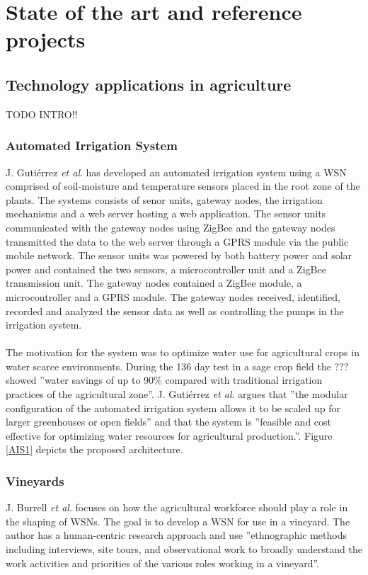\documentclass[]{uiophd}
\begin{document}
\chapter{State of the art and reference projects}

\section{Technology applications in agriculture}
TODO INTRO!!

\subsection{Automated Irrigation System}
J. Gutiérrez \textit{et al}. \parencite{6582678} has developed an automated irrigation system using a WSN comprised of soil-moisture and temperature sensors placed in the root zone of the plants. The systems consists of senor units, gateway nodes, the irrigation mechanisms and a web server hosting a web application. The sensor units communicated with the gateway nodes using ZigBee and the gateway nodes transmitted the data to the web server through a GPRS module via the public mobile network. The sensor units was powered by both battery power and solar power and contained the two sensors, a microcontroller unit and a ZigBee transmission unit. The gateway nodes contained a ZigBee module, a microcontroller and a GPRS module. The gateway nodes received, identified, recorded and analyzed the sensor data as well as controlling the pumps in the irrigation system.
\\\\
The motivation for the system was to optimize water use for agricultural crops in water scarce environments. During the 136 day test in a sage crop field the ??? showed ''water savings of up to 90\% compared with traditional irrigation practices of the agricultural zone''\parencite{6582678174}. J. Gutiérrez \textit{et al}. argues that ''the modular configuration of the automated irrigation system allows it to be scaled up for larger greenhouses or open fields''\parencite{6582678166} and that the system is ''feasible and cost effective for optimizing water resources for agricultural production.''\parencite{6582678174}. Figure \ref{AIS1} depicts the proposed architecture.

\subsection{Vineyards}
J. Burrell \textit{et al}.\parencite{1269130} focuses on how the agricultural workforce should play a role in the shaping of WSNs. The goal is to develop a WSN for use in a vineyard. The author has a human-centric research approach and use ''ethnographic methods including interviews, site tours, and observational work to broadly understand the work activities and priorities of the various roles working in a vineyard''\parencite{126913038}.
\end{document}
